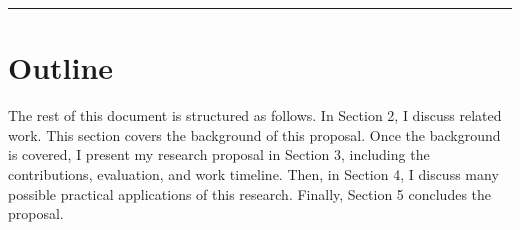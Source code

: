 \fancybreak{\pfbreakdisplay}

\section{Outline}
\label{sec:outline}

The rest of this document is structured as follows. In Section 2, I discuss related work.
This section covers the background of this proposal. Once the background is covered, I
present my research proposal in Section 3, including the contributions, evaluation, and
work timeline. Then, in Section 4, I discuss many possible practical applications of this
research. Finally, Section 5 concludes the proposal.